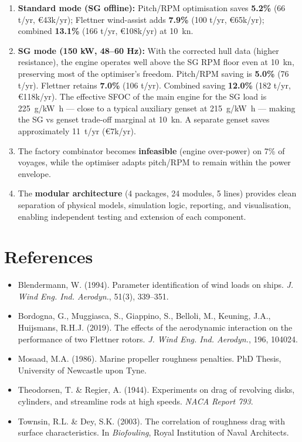 \documentclass[a4paper,11pt]{article}
\begin{document}
\begin{enumerate}
\item \textbf{Standard mode (SG offline):} Pitch/RPM optimisation saves \textbf{5.2\%}
(66 t/yr, \euro43k/yr); Flettner wind-assist adds \textbf{7.9\%}
(100 t/yr, \euro65k/yr); combined \textbf{13.1\%}
(166 t/yr, \euro108k/yr) at \SI{10}{\knot}.

\item \textbf{SG mode (150 kW, 48--60 Hz):} With the corrected hull data (higher
resistance), the engine operates well above the SG RPM floor even at
\SI{10}{\knot}, preserving most of the optimiser's freedom.  Pitch/RPM saving
is \textbf{5.0\%} (76 t/yr).  Flettner retains \textbf{7.0\%}
(106 t/yr).  Combined saving \textbf{12.0\%} (182 t/yr,
\euro118k/yr).  The effective SFOC of the main engine for the SG
load is \SI{225}{\gram/\kilo\watt\hour} --- close to a typical auxiliary
genset at \SI{215}{\gram/\kilo\watt\hour} --- making the SG vs genset
trade-off marginal at \SI{10}{\knot}.  A separate genset saves approximately
\SI{11}{t/yr} (\euro7k/yr).

\item The factory combinator becomes \textbf{infeasible} (engine over-power) on 7\% of
voyages, while the optimiser adapts pitch/RPM to remain within the power
envelope.

\item The \textbf{modular architecture} (4 packages, 24 modules, 5 lines)
provides clean separation of physical models, simulation logic, reporting, and
visualisation, enabling independent testing and extension of each component.
\end{enumerate}

\section{References}
\label{sec:org05eef08}

\begin{itemize}
\item Blendermann, W. (1994). Parameter identification of wind loads on ships.
\emph{J. Wind Eng. Ind. Aerodyn.}, 51(3), 339--351.
\item Bordogna, G., Muggiasca, S., Giappino, S., Belloli, M., Keuning, J.A.,
Huijsmans, R.H.J. (2019). The effects of the aerodynamic interaction on the
performance of two Flettner rotors. \emph{J. Wind Eng. Ind. Aerodyn.}, 196, 104024.
\item Mosaad, M.A. (1986). Marine propeller roughness penalties. PhD Thesis,
University of Newcastle upon Tyne.
\item Theodorsen, T. \& Regier, A. (1944). Experiments on drag of revolving disks,
cylinders, and streamline rods at high speeds. \emph{NACA Report 793}.
\item Townsin, R.L. \& Dey, S.K. (2003). The correlation of roughness drag with
surface characteristics. In \emph{Biofouling}, Royal Institution of Naval Architects.
\end{itemize}
\end{document}

